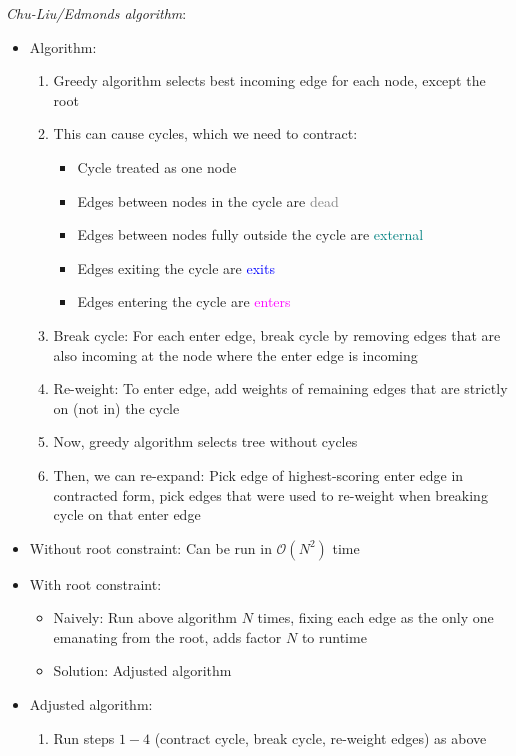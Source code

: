\emph{Chu-Liu/Edmonds algorithm}:
\begin{itemize}
    \item Algorithm:
    \begin{enumerate}
        \item Greedy algorithm selects best incoming edge for each node, except the root
        \item This can cause cycles, which we need to contract:
        \begin{itemize}
            \item Cycle treated as one node
            \item Edges between nodes in the cycle are \textcolor{gray}{dead}
            \item Edges between nodes fully outside the cycle are \textcolor{teal}{external}
            \item Edges exiting the cycle are \textcolor{blue}{exits}
            \item Edges entering the cycle are \textcolor{magenta}{enters}
        \end{itemize}
        \item Break cycle: For each enter edge, break cycle by removing edges that are also incoming at the node where the enter edge is incoming
        \item Re-weight: To enter edge, add weights of remaining edges that are strictly on (not in) the cycle
        \item Now, greedy algorithm selects tree without cycles
        \item Then, we can re-expand: Pick edge of highest-scoring enter edge in contracted form, pick edges that were used to re-weight when breaking cycle on that enter edge
    \end{enumerate}
    \item Without root constraint: Can be run in $\mathcal{O}(N^2)$ time
    \item With root constraint:
    \begin{itemize}
        \item Naively: Run above algorithm $N$ times, fixing each edge as the only one emanating from the root, adds factor $N$ to runtime
        \item Solution: Adjusted algorithm
    \end{itemize}
    \item Adjusted algorithm:
    \begin{enumerate}
        \item Run steps $1-4$ (contract cycle, break cycle, re-weight edges) as above

\end{enumerate}
\end{itemize}
